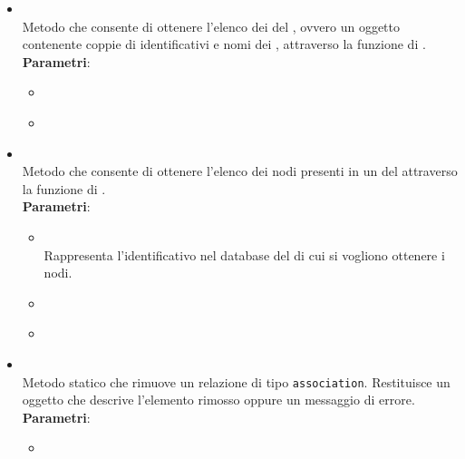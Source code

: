\begin{itemize}
\begin{itemize}
\item {}
\\ Metodo che consente di ottenere l’elenco dei  del , ovvero un oggetto  contenente coppie di identificativi e nomi dei , attraverso la funzione di .
\\ \textbf{Parametri}:
\begin{itemize}
\item {}
\\ \dpCallback
\item {}
\\ \dpErrBack
\end{itemize}
\item {}
\\ Metodo che consente di ottenere l’elenco dei nodi presenti in un  del  attraverso la funzione di .
\\ \textbf{Parametri}:
\begin{itemize}
\item {}
\\ Rappresenta l'identificativo nel database del  di cui si vogliono ottenere i nodi.
\item {}
\\ \dpCallback
\item {}
\\ \dpErrBack
\end{itemize}
\item {}
\\ Metodo statico che rimuove un relazione di tipo \texttt{association}. Restituisce un oggetto  che descrive l’elemento rimosso oppure un messaggio di errore.
\\ \textbf{Parametri}:
\begin{itemize}
\item {}
\\ \dpCallback

\end{itemize}
\end{itemize}
\end{itemize}
